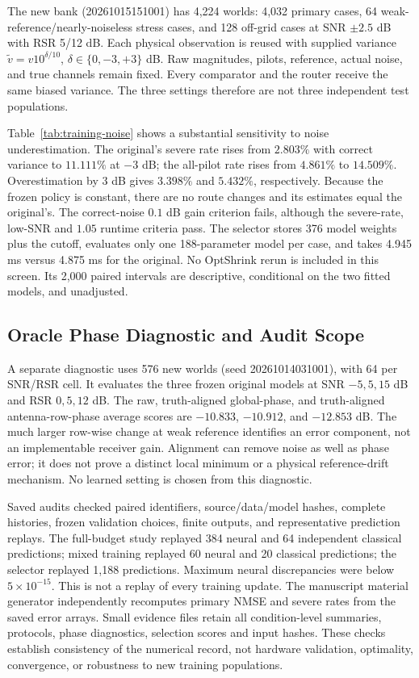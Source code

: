 The new bank (20261015151001) has 4,224 worlds: 4,032 primary cases,
64 weak-reference/nearly-noiseless stress cases, and 128 off-grid cases
at SNR $\pm2.5$ dB with RSR 5/12 dB. Each physical observation is reused
with supplied variance $\widetilde v=v10^{\delta/10}$,
$\delta\in\{0,-3,+3\}$ dB. Raw magnitudes, pilots, reference, actual
noise, and true channels remain fixed. Every comparator and the router
receive the same biased variance. The three settings therefore are not
three independent test populations.

Table~\ref{tab:training-noise} shows a substantial sensitivity to noise
underestimation. The original's severe rate rises from $2.803\%$ with
correct variance to $11.111\%$ at $-3$ dB; the all-pilot rate rises
from $4.861\%$ to $14.509\%$. Overestimation by 3 dB gives $3.398\%$
and $5.432\%$, respectively. Because the frozen policy is constant,
there are no route changes and its estimates equal the original's.
The correct-noise $0.1$ dB gain criterion fails, although the severe-rate,
low-SNR and $1.05$ runtime criteria pass. The selector stores 376 model
weights plus the cutoff, evaluates only one 188-parameter model per
case, and takes 4.945 ms versus 4.875 ms for the original. No OptShrink
rerun is included in this screen. Its 2,000 paired intervals are
descriptive, conditional on the two fitted models, and unadjusted.

\subsection{Oracle Phase Diagnostic and Audit Scope}

A separate diagnostic uses 576 new worlds (seed 20261014031001), with
64 per SNR/RSR cell. It evaluates the three frozen original models at
SNR $-5,5,15$ dB and RSR $0,5,12$ dB. The raw, truth-aligned global-phase,
and truth-aligned antenna-row-phase average scores are $-10.833$,
$-10.912$, and $-12.853$ dB. The much larger row-wise change at weak
reference identifies an error component, not an implementable receiver
gain. Alignment can remove noise as well as phase error; it does not
prove a distinct local minimum or a physical reference-drift mechanism.
No learned setting is chosen from this diagnostic.

Saved audits checked paired identifiers, source/data/model hashes,
complete histories, frozen validation choices, finite outputs, and
representative prediction replays. The full-budget study replayed
384 neural and 64 independent classical predictions; mixed training
replayed 60 neural and 20 classical predictions; the selector replayed
1,188 predictions. Maximum neural discrepancies were below
$5\times10^{-15}$. This is not a replay of every training update.
The manuscript material generator independently recomputes primary
NMSE and severe rates from the saved error arrays. Small evidence files
retain all condition-level summaries, protocols, phase diagnostics,
selection scores and input hashes. These checks establish consistency
of the numerical record, not hardware validation, optimality,
convergence, or robustness to new training populations.


